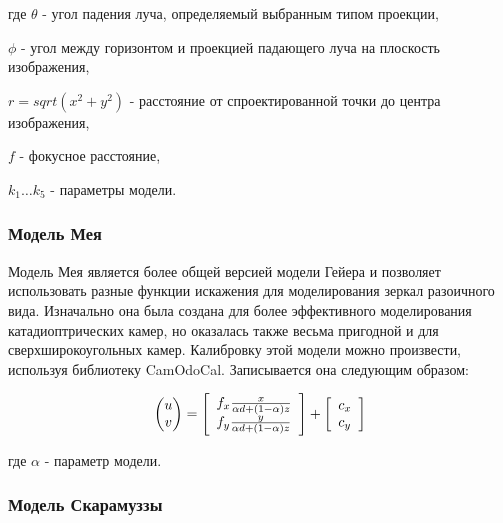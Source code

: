 где $\theta$ - угол падения луча, определяемый выбранным типом проекции,

\qquad $\phi$ - угол между горизонтом и проекцией падающего луча на плоскость изображения, 

\qquad $r = sqrt(x^2+y^2)$ - расстояние от спроектированной точки до центра изображения, 

\qquad $f$ - фокусное расстояние, 

\qquad $k_1 \dots k_5$ - параметры модели.

\subsubsection{Модель Мея}

Модель Мея \cite{mei} является более общей версией модели Гейера \cite{geyer} и позволяет использовать разные 
функции искажения для моделирования зеркал разоичного вида. Изначально она была создана для более 
эффективного моделирования катадиоптрических камер, но оказалась также весьма пригодной и для сверхширокоугольных камер. 
Калибровку этой модели можно произвести, используя библиотеку CamOdoCal. Записывается она следующим образом:

\begin{equation}
    \vspace{12pt}
    \begin{pmatrix}u\\v\end{pmatrix}=\left[\begin{array}{l}
	f_{x} \frac{x}{\alpha d+(1-\alpha) z} \\
	f_{y} \frac{y}{\alpha d+(1-\alpha) z}
	\end{array}\right]+\left[\begin{array}{l}
	c_{x} \\
	c_{y}
	\end{array}\right]
    \vspace{12pt}
\end{equation}

где $\alpha$ - параметр модели. 

\subsubsection{Модель Скарамуззы}

